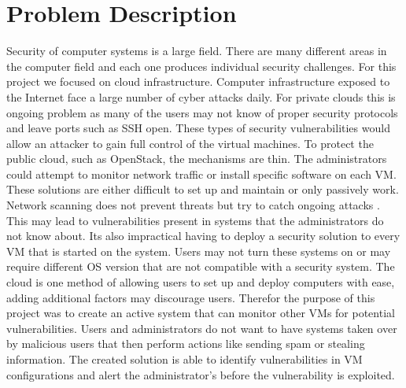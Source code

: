 \documentclass[12pt]{article}
\begin{document}
\section{Problem Description}
Security of computer systems is a large field. There are many different areas in the computer field and each one produces individual security challenges. For this project we focused on cloud infrastructure. Computer infrastructure exposed to the Internet face a large number of cyber attacks daily\cite{cimpanu_2017}. For private clouds this is ongoing problem as many of the users may not know of proper security protocols and leave ports such as SSH open. These types of security vulnerabilities would allow an attacker to gain full control of the virtual machines. To protect the public cloud, such as OpenStack, the mechanisms are thin. The administrators could attempt to monitor network traffic or install specific software on each VM. These solutions are either difficult to set up and maintain or only passively work. Network scanning does not prevent threats but try to catch ongoing attacks \cite{global}. This may lead to vulnerabilities present in systems that the administrators do not know about. Its also impractical having to deploy a security solution to every VM that is started on the system. Users may not turn these systems on or may require different OS version that are not compatible with a security system. The cloud is one method of allowing users to set up and deploy computers with ease, adding additional factors may discourage users. Therefor the purpose of this project was to create an active system that can monitor other VMs for potential vulnerabilities. Users and administrators do not want to have systems taken over by malicious users that then perform actions like sending spam or stealing information. The created solution is able to identify vulnerabilities in VM configurations and alert the administrator's before the vulnerability is exploited. 
\end{document}
